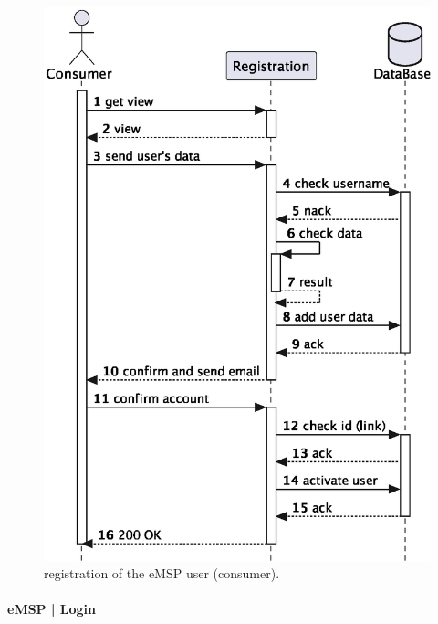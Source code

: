 \begin{figure}[h!]
    \centering
    \includegraphics[width=0.46\columnwidth]{./images/diagrams/sequences/emsp/registration}
    \caption{registration of the eMSP user (consumer).}
\end{figure}

\pagebreak

\paragraph{eMSP | Login}

